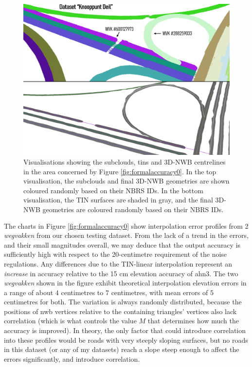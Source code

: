 \begin{figure}
    \centering
    \includegraphics[width=0.9\linewidth]{final_report/figs/formalaccuracy1.png}
    \caption[Renders showing the subclouds, TINs and 3D-NWB centrelines relevant to Figure \ref{fig:formalaccuracy0}]{Visualisations showing the subclouds, \ac{tin}s and 3D-NWB centrelines in the area concerned by Figure \ref{fig:formalaccuracy0}. In the top visualisation, the subclouds and final 3D-NWB geometries are shown coloured randomly based on their NBRS IDs. In the bottom visualisation, the TIN surfaces are shaded in gray, and the final 3D-NWB geometries are coloured randomly based on their NBRS IDs.}
    \label{fig:formalaccuracy1}
\end{figure}

The charts in Figure \ref{fig:formalaccuracy0} show interpolation error profiles from 2 \textit{wegvakken} from our chosen testing dataset. From the lack of a trend in the errors, and their small magnitudes overall, we may deduce that the output accuracy is sufficiently high with respect to the 20-centimetre requirement of the noise regulations. Any differences due to the TIN-linear interpolation represent an \textit{increase} in accuracy relative to the 15 cm elevation accuracy of \ac{ahn3}. The two \textit{wegvakken} shown in the figure exhibit theoretical interpolation elevation errors in a range of about 4 centimetres to 7 centimetres, with mean errors of 5 centimetres for both. The variation is always randomly distributed, because the positions of \ac{nwb} vertices relative to the containing triangles' vertices also lack correlation (which is what controls the value $M$ that determines how much the accuracy is improved). In theory, the only factor that could introduce correlation into these profiles would be roads with very steeply sloping surfaces, but no roads in this dataset (or any of my datasets) reach a slope steep enough to affect the errors significantly, and introduce correlation.

